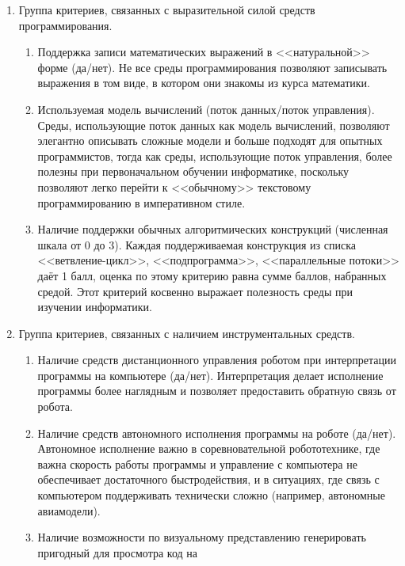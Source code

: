 \documentclass[a5paper]{article}
\begin{document}
\begin{enumerate}
    \item Группа критериев, связанных с выразительной силой средств программирования.
    \begin{enumerate}
        \item Поддержка записи математических выражений в <<натуральной>> форме (да/нет). Не все среды 
                программирования позволяют записывать выражения в том виде, в котором они знакомы из курса математики.
        \item Используемая модель вычислений (поток данных/поток управления). Среды, использующие поток 
                данных как модель вычислений, позволяют элегантно описывать сложные модели и больше подходят 
                для опытных программистов, тогда как среды, использующие поток управления, более полезны при 
                первоначальном обучении информатике, поскольку позволяют легко перейти к <<обычному>> текстовому 
                программированию в императивном стиле.
        \item Наличие поддержки обычных алгоритмических конструкций (численная шкала от 0 до 3). Каждая 
                поддерживаемая конструкция из списка <<ветвление-цикл>>, <<подпрограмма>>, <<параллельные потоки>> 
                даёт 1 балл, оценка по этому критерию равна сумме баллов, набранных средой. Этот критерий 
                косвенно выражает полезность среды при изучении информатики.
    \end{enumerate}
    \item Группа критериев, связанных с наличием инструментальных средств.
    \begin{enumerate}
        \item Наличие средств дистанционного управления роботом при интерпретации программы на компьютере (да/нет). 
                Интерпретация делает исполнение программы более наглядным и позволяет предоставить обратную 
                связь от робота.
        \item Наличие средств автономного исполнения программы на роботе (да/нет). Автономное исполнение 
                важно в соревновательной робототехнике, где важна скорость работы программы и управление с 
                компьютера не обеспечивает достаточного быстродействия, и в ситуациях, где связь с компьютером 
                поддерживать технически сложно (например, автономные авиамодели).
        \item Наличие возможности по визуальному представлению генерировать пригодный для просмотра код на 

\end{enumerate}
\end{enumerate}
\end{document}
